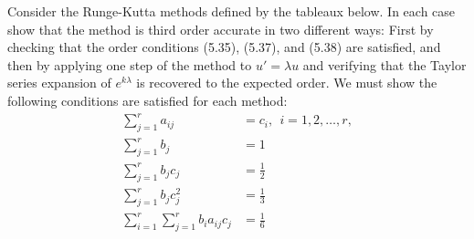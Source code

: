 \documentclass{article}
\begin{document}
Consider the Runge-Kutta methods defined by the tableaux below. In each case show that the method is third order accurate in two different ways: First by checking that the order conditions (5.35), (5.37), and (5.38) are satisfied, and then by applying one step of the method to $u' = \lambda u$ and verifying that the Taylor series expansion of $e^{k\lambda}$ is recovered to the expected order. 
\newline
We must show the following conditions are satisfied for each method:
\begin{align*}
    \sum_{j=1}^ra_{ij} &= c_i, \:\: i = 1,2, \dots, r, \\
    \sum_{j=1}^rb_j &= 1 \\
    \sum_{j=1}^rb_jc_j &= \frac{1}{2} \\
    \sum_{j=1}^rb_jc^2_j &= \frac{1}{3} \\
    \sum_{i=1}^r\sum_{j=1}^rb_ia_{ij}c_j &= \frac{1}{6} \\
\end{align*}
\end{document}
